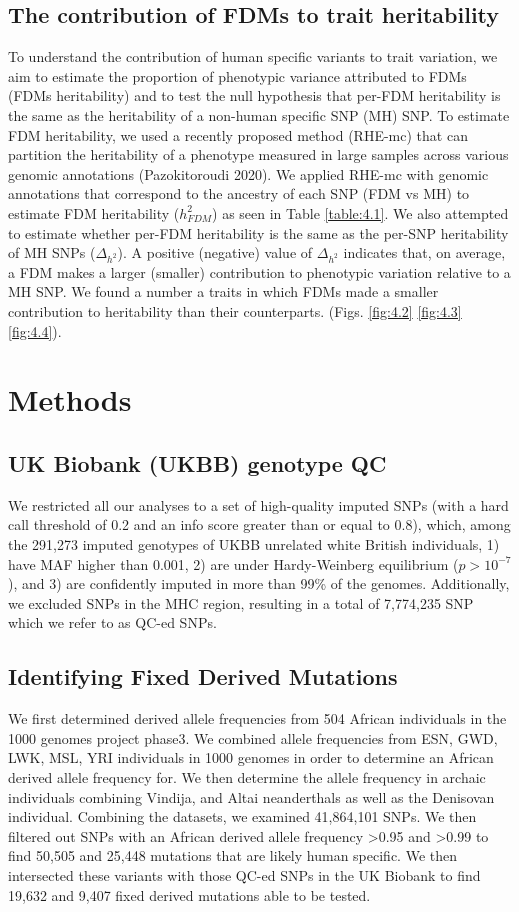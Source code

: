 \subsection{The contribution of FDMs to trait heritability}
To understand the contribution of human specific  variants to trait variation, we aim to estimate the proportion of phenotypic variance attributed to FDMs (FDMs heritability) and to test the null hypothesis that per-FDM heritability is the same as the heritability of a non-human specific SNP (MH) SNP. 
To estimate FDM heritability, we used a recently proposed method (RHE-mc) that can partition the heritability of a phenotype measured in large samples across various genomic annotations (Pazokitoroudi 2020). We applied RHE-mc with genomic annotations that correspond to the ancestry of each SNP (FDM vs MH) to estimate FDM heritability ($h^2_{FDM}$) as seen in Table \ref{table:4.1}. We also attempted to estimate whether per-FDM heritability is the same as the per-SNP heritability of MH SNPs ($\Delta_{h^2}$). A positive (negative) value of $\Delta_{h^2}$ indicates that, on average, a FDM makes a larger (smaller) contribution to phenotypic variation relative to a MH SNP. We found a number a traits in which FDMs made a smaller contribution to heritability than their counterparts. (Figs. \ref{fig:4.2} \ref{fig:4.3} \ref{fig:4.4}).
\section{Methods}
\subsection{UK Biobank (UKBB) genotype QC}
We restricted all our analyses to a set of high-quality imputed SNPs (with a hard call threshold of 0.2 and an info score greater than or equal to 0.8), which, among the 291,273 imputed genotypes of UKBB unrelated white British individuals, 1) have MAF higher than 0.001, 2) are under Hardy-Weinberg equilibrium ($p > 10^{-7}$), and 3) are confidently imputed in more than 99\% of the genomes. Additionally, we excluded SNPs in the MHC region, resulting in a total of 7,774,235 SNP which we refer to as QC-ed SNPs.
\subsection{Identifying Fixed Derived Mutations}
 We first determined derived allele frequencies from 504 African individuals in the 1000 genomes project phase3. We combined allele frequencies from ESN, GWD, LWK, MSL, YRI individuals in 1000 genomes in order to determine an African derived allele frequency for. We then determine the allele frequency in archaic individuals combining Vindija, and Altai neanderthals as well as the Denisovan individual. Combining the datasets, we examined 41,864,101 SNPs. We then filtered out SNPs with an African derived allele frequency >0.95 and >0.99 to find 50,505 and 25,448 mutations that are likely human specific. We then intersected these variants with those QC-ed SNPs in the UK Biobank to find 19,632 and 9,407 fixed derived mutations able to be tested.
 
